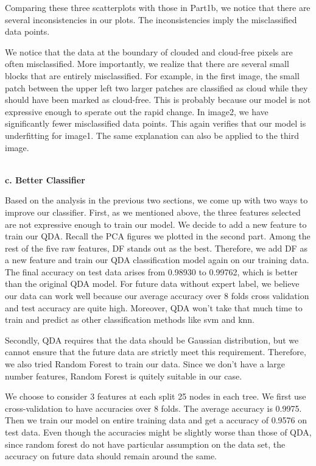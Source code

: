 \documentclass[11pt]{article}
\begin{document}
Comparing these three scatterplots with those in Part1b, we notice that there are several inconsistencies in our plots. The inconsistencies imply the misclassified data points. 

We notice that the data at the boundary of clouded and cloud-free pixels are often misclassified. More importantly, we realize that there are several small blocks that are entirely misclassified. For example, in the first image, the small patch between the upper left two larger patches are classified as cloud while they should have been marked as cloud-free. This is probably because our model is not expressive enough to sperate out the rapid change. In image2, we have significantly fewer misclassified data points. This again verifies that our model is underfitting for image1. The same explanation can also be applied to the third image.


\vspace{0.3cm}
\mbox{}\\
\textbf{c. Better Classifier}

Based on the analysis in the previous two sections, we come up with two ways to improve our classifier.
First, as we mentioned above, the three features selected are not expressive enough to train our model. We decide to add a new feature to train our QDA. Recall the PCA figures we plotted in the second part. Among the rest of the five raw features, DF stands out as the best. Therefore, we add DF as a new feature and train our QDA classification model again on our training data. The final accuracy on test data arises from 0.98930 to 0.99762, which is better than the original QDA model. For future data without expert label, we believe our data can work well because our average accuracy over 8 folds cross validation and test accuracy are quite high. Moreover, QDA won't take that much time to train and predict as other classification methods like svm and knn.

Secondly, QDA requires that the data should be Gaussian distribution, but we cannot ensure that the future data are strictly meet this requirement. Therefore, we also tried Random Forest to train our data. Since we don't have a large number features, Random Forest is quitely suitable in our case.

We choose to consider 3 features at each split 25 nodes in each tree. We first use cross-validation to have accuracies over 8 folds. The average accuracy is 0.9975. Then we train our model on entire training data and get a accuracy of 0.9576 on test data. Even though the accuracies might be slightly worse than those of QDA, since random forest do not have particular assumption on the data set, the accuracy on future data should remain around the same.
\end{document}
